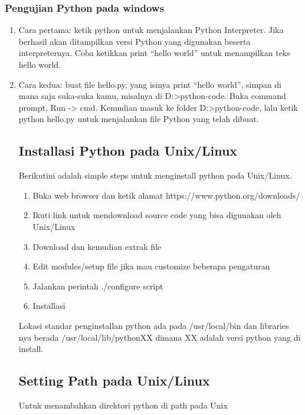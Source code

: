\subsubsection{Pengujian Python pada windows}
	\begin{enumerate}
	\item Cara pertama: ketik python untuk menjalankan Python Interpreter. 
	      Jika berhasil akan ditampilkan versi Python yang digunakan beserta interpreternya. 
	      Coba ketikkan print “hello world” untuk menampilkan teks hello world.
	\item Cara kedua: buat file hello.py, yang isinya print “hello world”, 
	      simpan di mana saja suka-suka kamu, misalnya di D:>python-code. Buka command prompt, Run -> cmd. 
	      Kemudian masuk ke folder D:>python-code, lalu ketik python hello.py untuk menjalankan file Python yang telah dibuat.

\subsection{Installasi Python pada Unix/Linux}
	Berikutini adalah simple steps untuk menginstall python pada Unix/Linux.
	\begin{enumerate}
	\item Buka web browser dan ketik alamat https://www.python.org/downloads/
	\item Ikuti link untuk mendownload source code yang bisa digunakan oleh Unix/Linux
	\item Download dan kemudian extrak file
	\item Edit modules/setup file jika mau customize beberapa pengaturan
	\item Jalankan perintah ./configure script
	\item Installasi 
	\end{enumerate}
Lokasi standar penginstallan python ada pada /usr/local/bin dan libraries nya berada 
/usr/local/lib/pythonXX dimana XX adalah versi python yang di install.

\subsection{Setting Path pada Unix/Linux}
Untuk menambahkan direktori python di path pada Unix


\end{enumerate}
